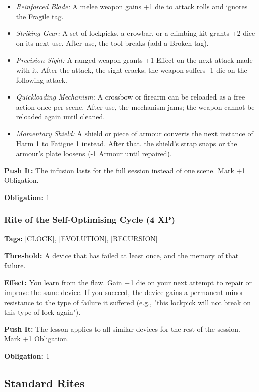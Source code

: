 \begin{itemize}
\item \textit{Reinforced Blade:} A melee weapon gains +1 die to attack rolls and ignores the Fragile tag.
\item \textit{Striking Gear:} A set of lockpicks, a crowbar, or a climbing kit grants +2 dice on its next use. After use, the tool breaks (add a Broken tag).
\item \textit{Precision Sight:} A ranged weapon grants +1 Effect on the next attack made with it. After the attack, the sight cracks; the weapon suffers -1 die on the following attack.
\item \textit{Quickloading Mechanism:} A crossbow or firearm can be reloaded as a free action once per scene. After use, the mechanism jams; the weapon cannot be reloaded again until cleaned.
\item \textit{Momentary Shield:} A shield or piece of armour converts the next instance of Harm 1 to Fatigue 1 instead. After that, the shield's strap snaps or the armour's plate loosens (-1 Armour until repaired).
\end{itemize}

\textbf{Push It:} The infusion lasts for the full session instead of one scene. Mark +1 Obligation.

\textbf{Obligation:} 1

\subsubsection{Rite of the Self-Optimising Cycle (4 XP)}

\textbf{Tags:} [CLOCK], [EVOLUTION], [RECURSION]

\textbf{Threshold:} A device that has failed at least once, and the memory of that failure.

\textbf{Effect:} You learn from the flaw. Gain +1 die on your next attempt to repair or improve the same device. If you succeed, the device gains a permanent minor resistance to the type of failure it suffered (e.g., "this lockpick will not break on this type of lock again").

\textbf{Push It:} The lesson applies to all similar devices for the rest of the session. Mark +1 Obligation.

\textbf{Obligation:} 1

\subsection{Standard Rites}

